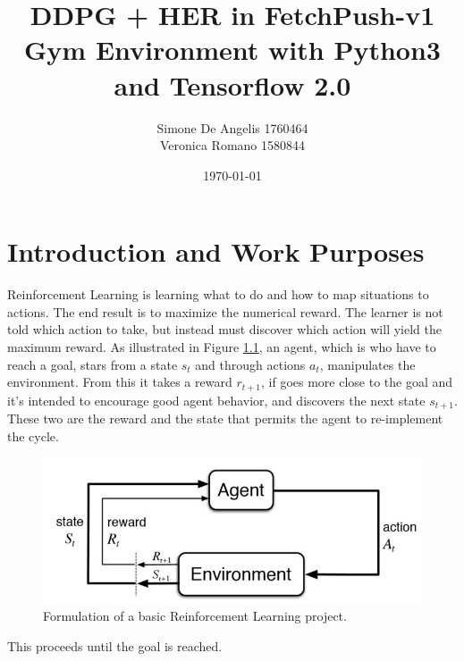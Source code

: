 \documentclass[a4paper]{report}
\title{DDPG + HER in FetchPush-v1 Gym Environment with Python3 and Tensorflow 2.0}
\author{Simone De Angelis 1760464\\ Veronica Romano 1580844}
\date{\today}
\begin{document}
\maketitle
\begin{abstract}

\end{abstract}
\chapter{Introduction and Work Purposes}
Reinforcement Learning is learning what to do and how to map situations to actions. The end result is to maximize the numerical reward. The learner is not told which action to take, but instead must discover which action will yield the maximum reward. As illustrated in Figure \ref{Fig: scheme}, an agent, which is who have to reach a goal, stars from a state $s_t$ and through actions $a_t$, manipulates the environment. From this it takes a reward $r_{t+1}$, if goes more close to the goal and it's intended to encourage good agent behavior, and discovers the next state $s_{t+1}$. These two are the reward and the state that permits the agent to re-implement the cycle. 

\begin{figure}[h!]
\centering
\includegraphics[scale=0.5]{reinforcement.jpg}
\caption{\label{Fig: scheme} Formulation of a basic Reinforcement Learning project.}
\end{figure}

This proceeds until the goal is reached. 

\end{document}
